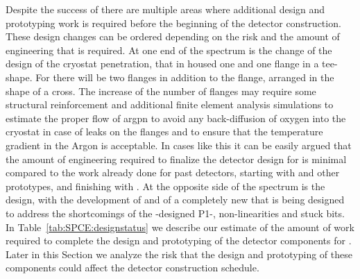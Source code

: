 Despite the success of  there are multiple areas where
additional design and prototyping work is required before the
beginning of the  detector construction. These design changes
can be ordered depending on the risk and the amount of engineering
that is required. At one end of the spectrum is the change of the
design of the cryostat penetration, that in  housed one
 and one  flange in a tee-shape. For 
there will be two  flanges in addition to the 
flange, arranged in the shape of a cross. The increase of the number
of flanges may require some structural reinforcement and additional
finite element analysis simulations to estimate the proper flow of
argpn to avoid any back-diffusion of oxygen into the cryostat in case
of leaks on the flanges and to ensure that the temperature gradient
in the Argon is acceptable. In cases like this it can be easily
argued that the amount of engineering required to finalize the
detector design for  is minimal compared to the work already
done for past  detectors, starting with  and
other prototypes, and finishing with . At the opposite
side of the spectrum is the  design, with the
development of  and of a completely new 
that is being designed to address the shortcomings of the -designed
P1-, non-linearities and stuck bits. In Table~\ref{tab:SPCE:designstatus}
we describe our estimate of the amount of work required to complete
the design and prototyping of the  detector components for
. Later in this Section we analyze the risk that the design
and prototyping of these components could affect the  detector
construction schedule.

